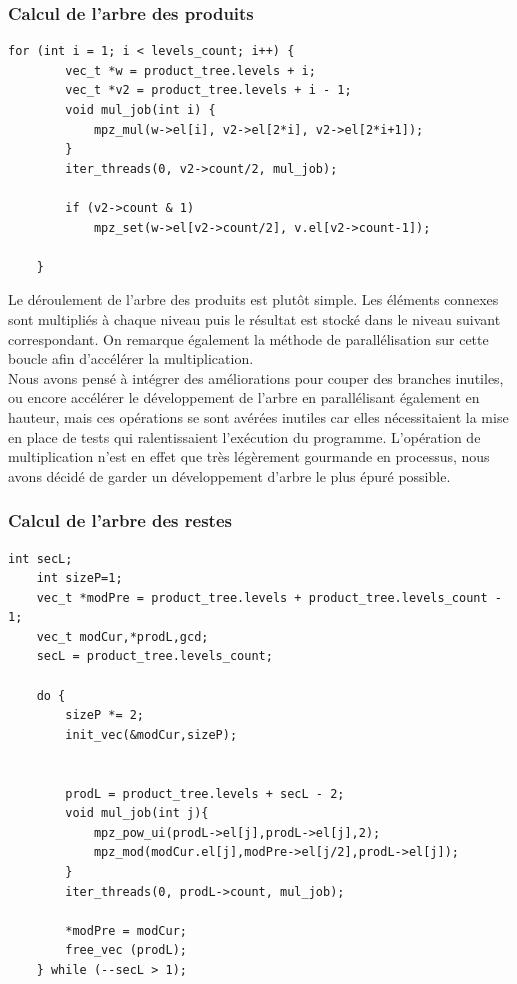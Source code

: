 \subsubsection{Calcul de l'arbre des produits}

\begin{lstlisting}[style=customc,caption=fact\_superspeed.c - partie 2, label=fact2]
	for (int i = 1; i < levels_count; i++) {
		vec_t *w = product_tree.levels + i;
		vec_t *v2 = product_tree.levels + i - 1;
		void mul_job(int i) {
			mpz_mul(w->el[i], v2->el[2*i], v2->el[2*i+1]);
		}
		iter_threads(0, v2->count/2, mul_job);

		if (v2->count & 1)
			mpz_set(w->el[v2->count/2], v.el[v2->count-1]); 

	}
\end{lstlisting}

Le déroulement de l'arbre des produits est plutôt simple. Les éléments connexes sont multipliés à chaque niveau puis le résultat est stocké dans le niveau suivant correspondant. On remarque également la méthode de parallélisation sur cette boucle afin d'accélérer la multiplication.\\

Nous avons pensé à intégrer des améliorations pour couper des branches inutiles, ou encore accélérer le développement de l'arbre en parallélisant également en hauteur, mais ces opérations se sont avérées inutiles car elles nécessitaient la mise en place de tests qui ralentissaient l'exécution du programme. L'opération de multiplication n'est en effet que très légèrement gourmande en processus, nous avons décidé de garder un développement d'arbre le plus épuré possible.\\




\subsubsection{Calcul de l'arbre des restes}

\begin{lstlisting}[style=customc,caption=fact\_superspeed.c - partie 3, label=fact3]
	int secL;
	int sizeP=1; 
	vec_t *modPre = product_tree.levels + product_tree.levels_count - 1;
	vec_t modCur,*prodL,gcd;
	secL = product_tree.levels_count;
	
	do {
		sizeP *= 2; 
		init_vec(&modCur,sizeP);	
	

		prodL = product_tree.levels + secL - 2;
		void mul_job(int j){			
			mpz_pow_ui(prodL->el[j],prodL->el[j],2); 
			mpz_mod(modCur.el[j],modPre->el[j/2],prodL->el[j]); 	
		}
		iter_threads(0, prodL->count, mul_job);
		
		*modPre = modCur;
		free_vec (prodL);	
	} while (--secL > 1);

\end{lstlisting}

